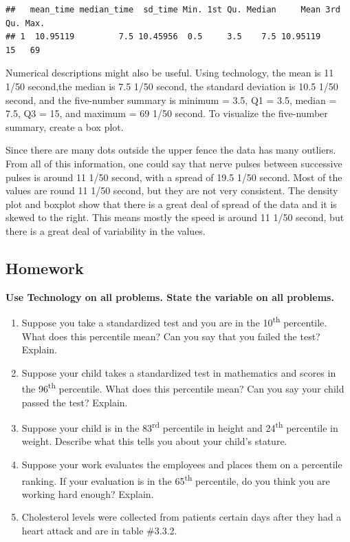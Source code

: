 \documentclass[]{book}
\begin{document}
\begin{verbatim}
##   mean_time median_time  sd_time Min. 1st Qu. Median     Mean 3rd Qu. Max.
## 1  10.95119         7.5 10.45956  0.5     3.5    7.5 10.95119      15   69
\end{verbatim}

Numerical descriptions might also be useful. Using technology, the mean is 11 1/50 second,the median is 7.5 1/50 second, the standard deviation is 10.5 1/50 second, and the five-number summary is minimum = 3.5, Q1 = 3.5, median = 7.5, Q3 = 15, and maximum = 69 1/50 second. To visualize the five-number summary, create a box plot.



Since there are many dots outside the upper fence the data has many outliers. From all of this information, one could say that nerve pulses between successive pulses is around 11 1/50 second, with a spread of 19.5 1/50 second. Most of the values are round 11 1/50 second, but they are not very consistent. The density plot and boxplot show that there is a great deal of spread of the data and it is skewed to the right. This means mostly the speed is around 11 1/50 second, but there is a great deal of variability in the values.

\hypertarget{homework-9}{%
\subsection{Homework}\label{homework-9}}

\textbf{Use Technology on all problems. State the variable on all problems.}

\begin{enumerate}
\def\labelenumi{\arabic{enumi}.}
\item
  Suppose you take a standardized test and you are in the 10\textsuperscript{th} percentile. What does this percentile mean? Can you say that you failed the test? Explain.
\item
  Suppose your child takes a standardized test in mathematics and scores in the 96\textsuperscript{th} percentile. What does this percentile mean? Can you say your child passed the test? Explain.
\item
  Suppose your child is in the 83\textsuperscript{rd} percentile in height and 24\textsuperscript{th} percentile in weight. Describe what this tells you about your child's stature.
\item
  Suppose your work evaluates the employees and places them on a percentile ranking. If your evaluation is in the 65\textsuperscript{th} percentile, do you think you are working hard enough? Explain.
\item
  Cholesterol levels were collected from patients certain days after they had a heart attack and are in table \#3.3.2.
\end{enumerate}
\end{document}
